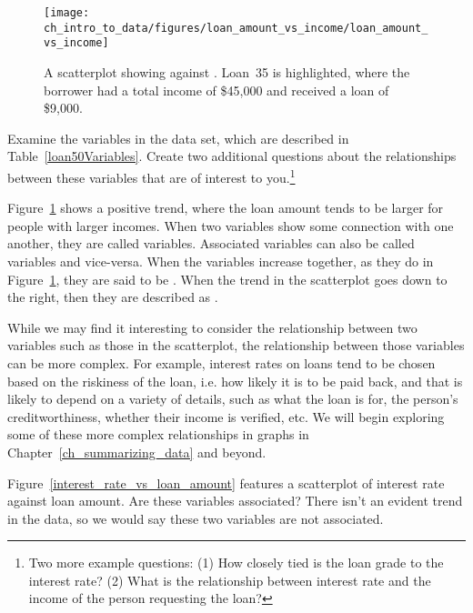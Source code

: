 \begin{figure}
\centering
\texttt{[image: ch\_intro\_to\_data/figures/loan\_amount\_vs\_income/loan\_amount\_vs\_income]}
\caption{A scatterplot showing 
  against . Loan~35 is highlighted,
  where the borrower had a total income of \$45,000 and received
  a loan of \$9,000.}
\label{loan_amount_vs_income}
\end{figure}

\begin{exercise}
Examine the variables in the  data set,
which are described in Table~\vref{loan50Variables}.
Create two additional questions about the relationships
between these variables that are of interest to
you.\footnote{Two more example questions:
  (1) How closely tied is the loan grade to the interest rate?
  (2) What is the relationship between interest rate and the
      income of the person requesting the loan?}
\end{exercise}

Figure~\ref{loan_amount_vs_income}
shows a positive trend, where the loan amount
tends to be larger for people with larger incomes.
When two variables show some connection with one another,
they are called  variables.
Associated variables can also be called 
variables and vice-versa.
When the variables increase together,
as they do in Figure~\ref{loan_amount_vs_income},
they are said to be .
When the trend in the scatterplot goes down to the right,
then they are described as .

While we may find it interesting to consider the relationship
between two variables such as those in the scatterplot,
the relationship between those variables can be more complex.
For example, interest rates on loans tend to be chosen based
on the riskiness of the loan, i.e. how likely it is to be
paid back, and that is likely to depend on a variety of
details, such as what the loan is for, the person's
creditworthiness, whether their income is verified, etc.
We will begin exploring some of these more complex relationships
in graphs in Chapter~\ref{ch_summarizing_data} and beyond.

\begin{example}{Figure~\ref{interest_rate_vs_loan_amount}
    features a scatterplot of interest rate against loan amount.
    Are these variables associated?}
  There isn't an evident trend in the data,
  so we would say these two variables are not associated.
\end{example}

